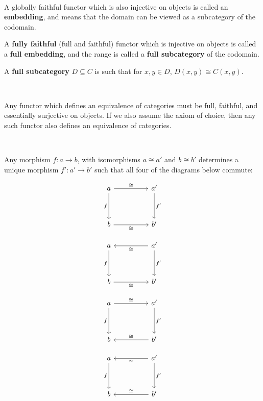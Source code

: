 \documentclass{article}
\begin{document}
\begin{definition}[Embeddings]
\

A globally faithful functor which is also injective on objects is called an \textbf{embedding}, and means that the domain can be viewed as a subcategory of the codomain.

A \textbf{fully faithful} (full and faithful) functor which is injective on objects is called a \textbf{full embedding}, and the range is called a \textbf{full subcategory} of the codomain.

A \textbf{full subcategory} $D \subseteq C$ is such that for $x,y \in D$, $D(x,y) \cong C(x,y)$. 
\end{definition}

\begin{theorem}
\

Any functor which defines an equivalence of categories must be full, faithful, and essentially surjective on objects. If we also assume the axiom of choice, then any such functor also defines an equivalence of categories.
\end{theorem}

\begin{lemma}
\

Any morphism $f: a \to b$, with isomorphisms $a \cong a'$ and $b \cong b'$ determines a unique morphism $f': a' \to b'$ such that all four of the diagrams below commute:

\[\begin{tikzcd}
	a &&  a'\\
    \\
    b &&  b'
    \arrow[from=1-1, to=1-3, "\cong"]
    \arrow[from=1-3, to=3-3, "f'"]
    \arrow[from=1-1, to=3-1, "f"']
    \arrow[from=3-1, to=3-3, "\cong"']
\end{tikzcd}\]

\[\begin{tikzcd}
	a &&  a'\\
    \\
    b &&  b'
    \arrow[from=1-3, to=1-1, "\cong"]
    \arrow[from=1-3, to=3-3, "f'"]
    \arrow[from=1-1, to=3-1, "f"']
    \arrow[from=3-1, to=3-3, "\cong"']
\end{tikzcd}\]

\[\begin{tikzcd}
	a &&  a'\\
    \\
    b &&  b'
    \arrow[ from=1-1, to=1-3, "\cong"]
    \arrow[ from=1-3, to=3-3, "f'"]
    \arrow[from=1-1, to=3-1, "f"']
    \arrow[from=3-3, to=3-1, "\cong"']
\end{tikzcd}\]

\[\begin{tikzcd}
	a &&  a'\\
    \\
    b &&  b'
    \arrow[ from=1-3, to=1-1, "\cong"]
    \arrow[ from=1-3, to=3-3, "f'"]
    \arrow[from=1-1, to=3-1, "f"']
    \arrow[from=3-3, to=3-1, "\cong"']
\end{tikzcd}\]
\end{lemma}
\end{document}
